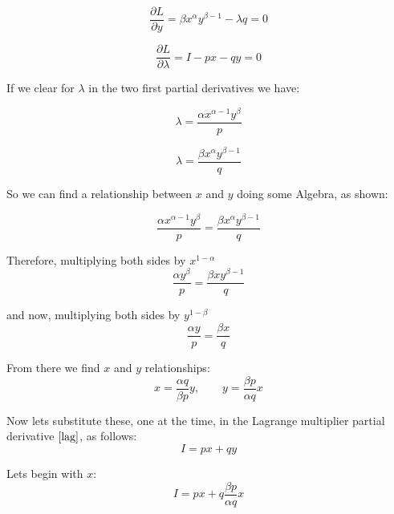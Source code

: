 \documentclass{article}
\begin{document}
  \begin{equation}
    \frac{\partial L}{\partial y} = \beta x^\alpha y^{\beta - 1} - \lambda q = 0
  \end{equation}

  \begin{equation}\label{lag}
    \frac{\partial L}{\partial \lambda} = I - px - qy = 0
  \end{equation}

\medskip

If we clear for $\lambda$ in the two first partial derivatives we have:

  \begin{equation}
    \lambda = \frac{\alpha x^{\alpha - 1} y^\beta}{p}
  \end{equation}

  \begin{equation}
    \lambda = \frac{\beta x^\alpha y^{\beta - 1}}{q}
  \end{equation}

So we can find a relationship between $x$ and $y$ doing some Algebra, as shown:

  \begin{equation}
    \frac{\alpha x^{\alpha - 1} y^\beta}{p} = \frac{\beta x^\alpha y^{\beta - 1}}{q}
  \end{equation}

\medskip

Therefore, multiplying both sides by $x^{1 - \alpha}$
  \begin{equation}
    \frac{\alpha y^\beta}{p} = \frac{\beta x  y^{\beta - 1}}{q}
  \end{equation}

and now, multiplying both sides by $y^{1 - \beta}$
  \begin{equation}
    \frac{\alpha y}{p} = \frac{\beta x}{q}
  \end{equation}

From there we find $x$ and $y$ relationships:
  \begin{equation}
   x = \frac{\alpha q}{\beta p}y, \qquad y = \frac{\beta p}{\alpha q}x
  \end{equation}

\medskip

Now lets substitute these, one at the time, in the Lagrange multiplier partial derivative $\ref{lag}$, as follows:
  \begin{equation}
    I = px + qy
  \end{equation}

Lets begin with $x$:
  \begin{equation}
    I = px + q\frac{\beta p}{\alpha q}x
  \end{equation}
\end{document}
